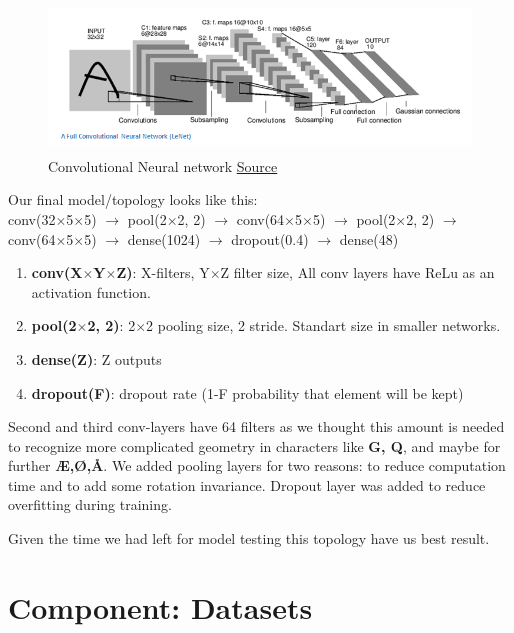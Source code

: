\documentclass[Report.tex]{subfiles}
\begin{document}
\begin{figure}[H]
  \centering
  \includegraphics[height=4cm]{res/LeNet.png}
  \caption{Convolutional Neural network \href{https://adeshpande3.github.io/A-Beginner\%27s-Guide-To-Understanding-Convolutional-Neural-Networks/}{Source}}
  \label{fig:CNN_architecture}
\end{figure}
\begin{flushleft}
Our final model/topology looks like this:\\
conv(32$\times$5$\times$5) $\rightarrow$ pool(2$\times$2, 2) $\rightarrow$ conv(64$\times$5$\times$5) $\rightarrow$ pool(2$\times$2, 2) $\rightarrow$ conv(64$\times$5$\times$5) $\rightarrow$ dense(1024) $\rightarrow$ dropout(0.4) $\rightarrow$ dense(48)

\begin{enumerate}
\item \textbf{conv(X$\times$Y$\times$Z)}: X-filters, Y$\times$Z filter size, All conv layers have ReLu as an activation function.
\item \textbf{pool(2$\times$2, 2)}: 2$\times$2 pooling size, 2 stride. Standart size in smaller networks.
\item \textbf{dense(Z)}: Z outputs
\item \textbf{dropout(F)}: dropout rate (1-F probability that element will be kept)
\end{enumerate}

Second and third conv-layers have 64 filters as we thought this amount is needed to recognize more complicated geometry in characters like \textbf{G, Q}, and maybe for further \textbf{Æ,Ø,Å}.
We added pooling layers for two reasons: to reduce computation time and to add some rotation invariance.
Dropout layer was added to reduce overfitting during training.

Given the time we had left for model testing this topology have us best result.
\end{flushleft}


\section{Component: Datasets}
\label{Method:Datasets}
\end{document}
